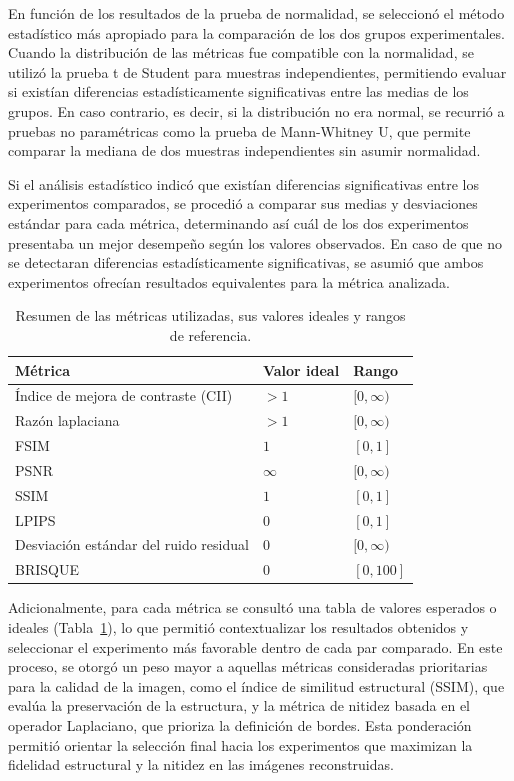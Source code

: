En función de los resultados de la prueba de normalidad, se seleccionó el método estadístico más apropiado para la comparación de los dos grupos experimentales. Cuando la distribución de las métricas fue compatible con la normalidad, se utilizó la prueba t de Student para muestras independientes, permitiendo evaluar si existían diferencias estadísticamente significativas entre las medias de los grupos. En caso contrario, es decir, si la distribución no era normal, se recurrió a pruebas no paramétricas como la prueba de Mann-Whitney U, que permite comparar la mediana de dos muestras independientes sin asumir normalidad.

Si el análisis estadístico indicó que existían diferencias significativas entre los experimentos comparados, se procedió a comparar sus medias y desviaciones estándar para cada métrica, determinando así cuál de los dos experimentos presentaba un mejor desempeño según los valores observados. En caso de que no se detectaran diferencias estadísticamente significativas, se asumió que ambos experimentos ofrecían resultados equivalentes para la métrica analizada.

\begin{table}[h]
    \centering
    \caption{Resumen de las métricas utilizadas, sus valores ideales y rangos de referencia.}
    \label{tab:metrics-expected-values}
    \begin{tabular}{>{\raggedright}p{5cm}p{3cm}p{3cm}}
        \toprule
        \textbf{Métrica} & \textbf{Valor ideal} & \textbf{Rango} \\
        \midrule
        Índice de mejora de contraste (CII) & $>1$ & $[0, \infty)$ \\
        Razón laplaciana & $>1$ & $[0, \infty)$ \\
        FSIM & $1$ & $[0, 1]$ \\
        PSNR & $\infty$ & $[0, \infty)$ \\
        SSIM & $1$ & $[0, 1]$ \\
        LPIPS & $0$ & $[0, 1]$ \\
        Desviación estándar del ruido residual & $0$ & $[0, \infty)$ \\
        BRISQUE & $0$ & $[0, 100]$ \\
        \bottomrule
    \end{tabular}
\end{table}

Adicionalmente, para cada métrica se consultó una tabla de valores esperados o ideales (Tabla~\ref{tab:metrics-expected-values}), lo que permitió contextualizar los resultados obtenidos y seleccionar el experimento más favorable dentro de cada par comparado. En este proceso, se otorgó un peso mayor a aquellas métricas consideradas prioritarias para la calidad de la imagen, como el índice de similitud estructural (SSIM), que evalúa la preservación de la estructura, y la métrica de nitidez basada en el operador Laplaciano, que prioriza la definición de bordes. Esta ponderación permitió orientar la selección final hacia los experimentos que maximizan la fidelidad estructural y la nitidez en las imágenes reconstruidas.

